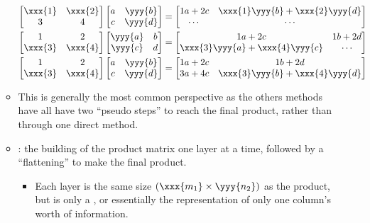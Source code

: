 \begin{itemize}
\begin{itemize}
\begin{align*}
    \\%
    \begin{bmatrix} \xxx{1} & \xxx{2} \\ 3 & 4 \end{bmatrix}
    \begin{bmatrix} a & \yyy{b} \\ c & \yyy{d} \end{bmatrix}
    &=
    \begin{bmatrix}
    1a + 2c & \xxx{1}\yyy{b}+\xxx{2}\yyy{d} \\ \cdots & \cdots 
    \end{bmatrix}
    \\%
    \begin{bmatrix} 1 & 2 \\ \xxx{3} & \xxx{4} \end{bmatrix}
    \begin{bmatrix}  \yyy{a} & b \\ \yyy{c} & d \end{bmatrix}
    &=
    \begin{bmatrix}
    1a + 2c & 1b+2d \\ \xxx{3}\yyy{a}+\xxx{4}\yyy{c} & \cdots 
    \end{bmatrix}
    \\%
    \begin{bmatrix} 1 & 2 \\ \xxx{3} & \xxx{4} \end{bmatrix}
    \begin{bmatrix} a & \yyy{b} \\ c & \yyy{d} \end{bmatrix}
    &=
    \begin{bmatrix}
    1a + 2c & 1b+2d \\ 3a+4c & \xxx{3}\yyy{b}+\xxx{4}\yyy{d} 
    \end{bmatrix}
    \end{align*}
    \item This is generally the most common perspective as the others methods have all have two ``pseudo steps'' to reach the final product, rather than through one direct method.
    \item {}: the building of the product matrix one layer at a time, followed by a ``flattening'' to make the final product.
      \begin{itemize}
        \item Each layer is the same size \((\xxx{m_1} \times \yyy{n_2})\) as the product, but is only a \hyperref[Matrix Rank]{}, or essentially the representation of only one column's worth of information.

\end{itemize}
\end{itemize}
\end{itemize}
